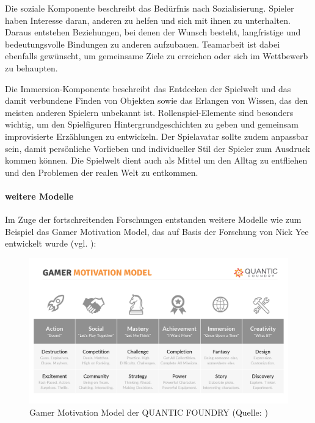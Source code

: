 Die soziale Komponente beschreibt das Bedürfnis nach Sozialisierung. Spieler haben Interesse daran, anderen zu helfen und sich mit ihnen zu unterhalten. Daraus entstehen Beziehungen, bei denen der Wunsch besteht, langfristige und bedeutungsvolle Bindungen zu anderen aufzubauen. Teamarbeit ist dabei ebenfalls gewünscht, um gemeinsame Ziele zu erreichen oder sich im Wettbewerb zu behaupten.

Die Immersion-Komponente beschreibt das Entdecken der Spielwelt und das damit verbundene Finden von Objekten sowie das Erlangen von Wissen, das den meisten anderen Spielern unbekannt ist. Rollenspiel-Elemente sind besonders wichtig, um den Spielfiguren Hintergrundgeschichten zu geben und gemeinsam improvisierte Erzählungen zu entwickeln. Der Spielavatar sollte zudem anpassbar sein, damit persönliche Vorlieben und individueller Stil der Spieler zum Ausdruck kommen können. Die Spielwelt dient auch als Mittel um den Alltag zu entfliehen und den Problemen der realen Welt zu entkommen.

\paragraph{weitere Modelle}
Im Zuge der fortschreitenden Forschungen entstanden weitere Modelle wie zum Beispiel das Gamer Motivation Model, das auf Basis der Forschung von Nick Yee entwickelt wurde (vgl. \cite{ludologie_spielertypen_nodate}):

\begin{figure}[ht]
\centering
\includegraphics[width=1\linewidth]{content/pictures/gamer_motivations_model.png}
\caption{Gamer Motivation Model der QUANTIC FOUNDRY (Quelle: \cite{noauthor_quantic_nodate})}
\label{fig:gamer_motivation_model}
\end{figure}

